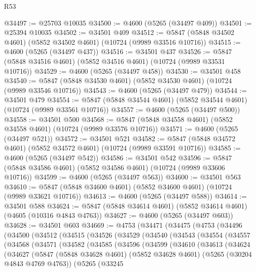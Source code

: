 \begin{lexlean}{R53}
\begin{coremodule}
@34497 := @25703 @10035
@34500 := @4600 (@5265 (@34497 @409))
@34501 := @25394 @10035
@34502 := @34501 @409
@34512 := @5847 (@5848 @34502 @4601) (@5852 @34502 @4601) (@10724 (@9989 @33516 @10716))
@34515 := @4600 (@5265 (@34497 @437))
@34516 := @34501 @437
@34526 := @5847 (@5848 @34516 @4601) (@5852 @34516 @4601) (@10724 (@9989 @33531 @10716))
@34529 := @4600 (@5265 (@34497 @458))
@34530 := @34501 @458
@34540 := @5847 (@5848 @34530 @4601) (@5852 @34530 @4601) (@10724 (@9989 @33546 @10716))
@34543 := @4600 (@5265 (@34497 @479))
@34544 := @34501 @479
@34554 := @5847 (@5848 @34544 @4601) (@5852 @34544 @4601) (@10724 (@9989 @33561 @10716))
@34557 := @4600 (@5265 (@34497 @500))
@34558 := @34501 @500
@34568 := @5847 (@5848 @34558 @4601) (@5852 @34558 @4601) (@10724 (@9989 @33576 @10716))
@34571 := @4600 (@5265 (@34497 @521))
@34572 := @34501 @521
@34582 := @5847 (@5848 @34572 @4601) (@5852 @34572 @4601) (@10724 (@9989 @33591 @10716))
@34585 := @4600 (@5265 (@34497 @542))
@34586 := @34501 @542
@34596 := @5847 (@5848 @34586 @4601) (@5852 @34586 @4601) (@10724 (@9989 @33606 @10716))
@34599 := @4600 (@5265 (@34497 @563))
@34600 := @34501 @563
@34610 := @5847 (@5848 @34600 @4601) (@5852 @34600 @4601) (@10724 (@9989 @33621 @10716))
@34613 := @4600 (@5265 (@34497 @588))
@34614 := @34501 @588
@34624 := @5847 (@5848 @34614 @4601) (@5852 @34614 @4601) (@4605 (@10316 @4843 @4763))
@34627 := @4600 (@5265 (@34497 @603))
@34628 := @34501 @603
@34669 := @4753
    (@34471
      (@34475
        (@4753
          (@34496
            (@34500
              (@34512
                (@34515
                  (@34526
                    (@34529
                      (@34540
                        (@34543
                          (@34554
                            (@34557
                              (@34568
                                (@34571
                                  (@34582
                                    (@34585
                                      (@34596
                                        (@34599
                                          (@34610
                                            (@34613
                                              (@34624
                                                (@34627
                                                  (@5847
                                                    (@5848 @34628 @4601)
                                                    (@5852 @34628 @4601)
                                                    (@5265 (@30204 @4843 @4769 @4763))
                                                    (@5265
                                                      (@33245

\end{coremodule}
\end{lexlean}
